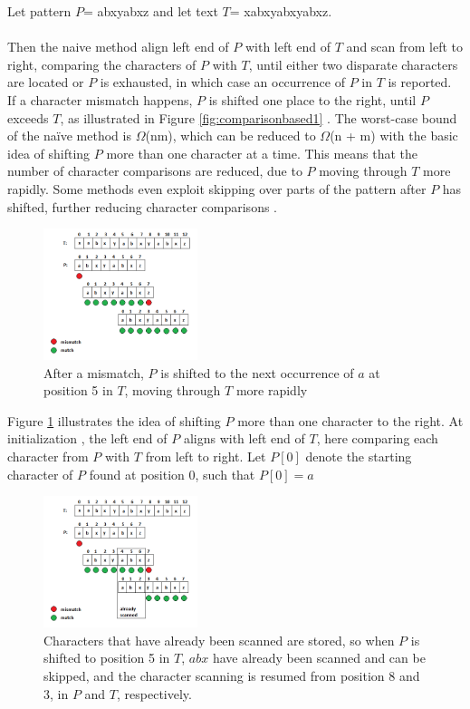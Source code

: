 \documentclass[12pt]{article} %
\begin{document}
Let pattern $P$=  abxyabxz and let text $T$= xabxyabxyabxz.
\\ \\
Then the naive method align left end of $P$  with left end of $T$ and scan from left to right, comparing the characters of $P$ with $T$, until either two disparate characters are located or $P$ is exhausted, in which case an occurrence of $P$ in $T$ is reported. If a character mismatch happens, $P$ is shifted one place to the right, until $P$ exceeds $T$, as illustrated in Figure \ref{fig:comparisonbased1} \cite{gusfield}.
The worst-case bound of the naïve method is $\Omega$(nm), which can be reduced to $\Omega$(n + m) with the basic idea of shifting $P$ more than one character at a time. This means that the number of character comparisons are reduced, due to $P$ moving through $T$ more rapidly. Some methods even exploit skipping over parts of the pattern after $P$ has shifted, further reducing character comparisons \cite{gusfield}. 
\begin{figure}[H]
    \centering
    \includegraphics[width=0.4\textwidth]{comparisonbased2}
    \captionsetup{width=0.8\textwidth}
    \caption{After a mismatch, $P$ is shifted to the next occurrence of $a$ at position 5 in $T$, moving through $T$ more rapidly}
    \label{fig:comparisonbased2}
\end{figure}
\newline   
Figure \ref{fig:comparisonbased2}  illustrates the idea of shifting $P$ more than one character to the right. At initialization , the left end of $P$ aligns with left end of $T$, here comparing each character from $P$ with $T$ from left to right.
\newline
Let $P[0]$ denote the starting character of $P$ found at position 0, such that $P[0]=a$
\newline
\begin{figure}[H]
    \centering
    \includegraphics[width=0.4\textwidth]{comparisonbased3}
    \captionsetup{width=0.8\textwidth}
    \caption{Characters that have already been scanned are stored, so when $P$ is shifted to position 5 in $T$, $abx$ have already been scanned and can be skipped, and the character scanning is resumed from position 8 and 3, in $P$ and $T$, respectively.}
    \label{fig:comparisonbased3}
\end{figure}
\end{document}
